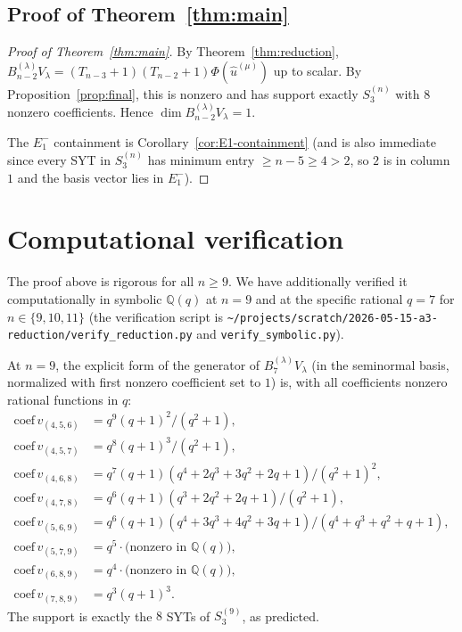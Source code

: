\documentclass[11pt]{article}
\theoremstyle{definition}
\begin{document}
\subsection{Proof of Theorem~\ref{thm:main}}

\begin{proof}[Proof of Theorem~\ref{thm:main}]
By Theorem~\ref{thm:reduction},
$B_{n-2}^{(\lambda)}V_\lambda=(T_{n-3}{+}1)(T_{n-2}{+}1)\Phi(\hat u^{(\mu)})$
up to scalar.  By Proposition~\ref{prop:final}, this is nonzero
and has support exactly $S_3^{(n)}$ with $8$ nonzero coefficients.
Hence $\dim B_{n-2}^{(\lambda)}V_\lambda=1$.

The $E_1^-$ containment is Corollary~\ref{cor:E1-containment} (and
is also immediate since every SYT in $S_3^{(n)}$ has minimum entry
$\ge n-5\ge 4>2$, so $2$ is in column~$1$ and the basis vector lies
in $E_1^-$).
\end{proof}

\section{Computational verification}\label{sec:verify}

The proof above is rigorous for all $n\ge 9$.  We have additionally
verified it computationally in symbolic $\mathbb{Q}(q)$ at $n=9$
and at the specific rational $q=7$ for $n\in\{9,10,11\}$ (the
verification script is
\texttt{\textasciitilde/projects/scratch/2026-05-15-a3-reduction/verify\_reduction.py}
and \texttt{verify\_symbolic.py}).

At $n=9$, the explicit form of the generator of
$B_7^{(\lambda)}V_\lambda$ (in the seminormal basis, normalized
with first nonzero coefficient set to $1$) is, with all
coefficients nonzero rational functions in $q$:
\begin{align*}
   \mathrm{coef}\,v_{(4,5,6)} &= q^9(q+1)^2/(q^2+1), \\
   \mathrm{coef}\,v_{(4,5,7)} &= q^8(q+1)^3/(q^2+1), \\
   \mathrm{coef}\,v_{(4,6,8)} &= q^7(q+1)(q^4+2q^3+3q^2+2q+1)/(q^2+1)^2, \\
   \mathrm{coef}\,v_{(4,7,8)} &= q^6(q+1)(q^3+2q^2+2q+1)/(q^2+1), \\
   \mathrm{coef}\,v_{(5,6,9)} &= q^6(q+1)(q^4+3q^3+4q^2+3q+1)/(q^4+q^3+q^2+q+1), \\
   \mathrm{coef}\,v_{(5,7,9)} &= q^5\cdot\text{(nonzero in }\mathbb{Q}(q)), \\
   \mathrm{coef}\,v_{(6,8,9)} &= q^4\cdot\text{(nonzero in }\mathbb{Q}(q)), \\
   \mathrm{coef}\,v_{(7,8,9)} &= q^3(q+1)^3.
\end{align*}
The support is exactly the $8$ SYTs of $S_3^{(9)}$, as predicted.
\end{document}
